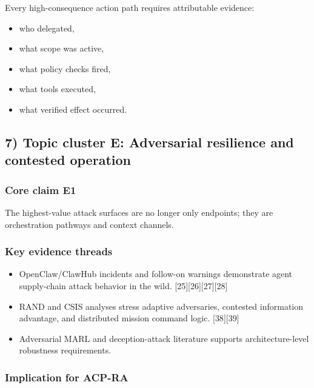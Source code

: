 \documentclass[11pt]{article}
\begin{document}
Every high-consequence action path requires attributable evidence:

\begin{itemize}
\tightlist
\item
  who delegated,
\item
  what scope was active,
\item
  what policy checks fired,
\item
  what tools executed,
\item
  what verified effect occurred.
\end{itemize}

\hypertarget{topic-cluster-e-adversarial-resilience-and-contested-operation}{%
\subsection{7) Topic cluster E: Adversarial resilience and contested
operation}\label{topic-cluster-e-adversarial-resilience-and-contested-operation}}

\hypertarget{core-claim-e1}{%
\subsubsection{Core claim E1}\label{core-claim-e1}}

The highest-value attack surfaces are no longer only endpoints; they are
orchestration pathways and context channels.

\hypertarget{key-evidence-threads-4}{%
\subsubsection{Key evidence threads}\label{key-evidence-threads-4}}

\begin{itemize}
\tightlist
\item
  OpenClaw/ClawHub incidents and follow-on warnings demonstrate agent
  supply-chain attack behavior in the wild.
  {[}25{]}{[}26{]}{[}27{]}{[}28{]}
\item
  RAND and CSIS analyses stress adaptive adversaries, contested
  information advantage, and distributed mission command logic.
  {[}38{]}{[}39{]}
\item
  Adversarial MARL and deception-attack literature supports
  architecture-level robustness requirements.
\end{itemize}

\hypertarget{implication-for-acp-ra-4}{%
\subsubsection{Implication for ACP-RA}\label{implication-for-acp-ra-4}}
\end{document}

